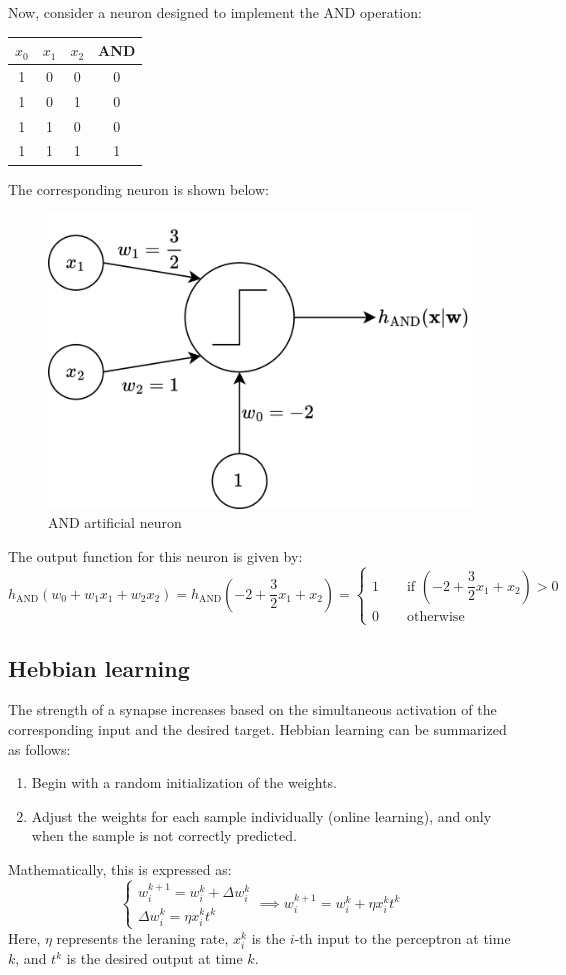 \begin{example}
    Now, consider a neuron designed to implement the AND operation:
    \begin{table}[H]
        \centering
        \begin{tabular}{ccc|c}
        $x_0$ & $x_1$ & $x_2$ & \textbf{AND} \\ \hline
        1     & 0     & 0     & 0           \\
        1     & 0     & 1     & 0           \\
        1     & 1     & 0     & 0           \\
        1     & 1     & 1     & 1          
        \end{tabular}
    \end{table}
    The corresponding neuron is shown below:
    \begin{figure}[H]
        \centering
        \includegraphics[width=0.45\linewidth]{images/and.png}
        \caption{AND artificial neuron}
    \end{figure}
    The output function for this neuron is given by:
    \[h_{\text{AND}}(w_0+w_1x_1+w_2x_2)=h_{\text{AND}}\left(-2+\dfrac{3}{2}x_1+x_2\right)=\begin{cases} 1\qquad\text{if }\left(-2+\dfrac{3}{2}x_1+x_2\right)>0 \\ 0\qquad\text{otherwise} \end{cases}\]
\end{example}

\subsection{Hebbian learning}
The strength of a synapse increases based on the simultaneous activation of the corresponding input and the desired target. 
Hebbian learning can be summarized as follows:
\begin{enumerate}
    \item Begin with a random initialization of the weights.
    \item Adjust the weights for each sample individually (online learning), and only when the sample is not correctly predicted.
\end{enumerate}
Mathematically, this is expressed as:
\[\begin{cases}
    w_i^{k+1}=w_i^k+\Delta w_i^k \\
    \Delta w_i^k=\eta x_i^kt^k
\end{cases} \implies w_i^{k+1}=w_i^k+\eta x_i^kt^k\]
Here, $\eta$ represents the leraning rate, $x_i^k$ is the $i$-th input to  the perceptron at time $k$, and $t^k$ is the desired output at time $k$.

